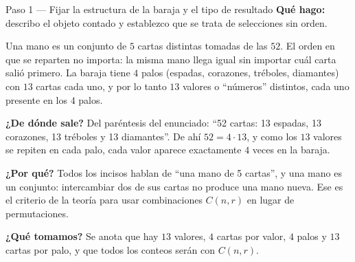 \documentclass[11pt]{article}
\begin{document}
\begin{paso}{Paso 1 --- Fijar la estructura de la baraja y el tipo de resultado}
\textbf{Qué hago:} describo el objeto contado y establezco que se trata de selecciones sin orden.

Una mano es un conjunto de $5$ cartas distintas tomadas de las $52$. El orden en que se reparten no importa: la misma mano llega igual sin importar cuál carta salió primero. La baraja tiene $4$ palos (espadas, corazones, tréboles, diamantes) con $13$ cartas cada uno, y por lo tanto $13$ valores o ``números'' distintos, cada uno presente en los $4$ palos.

\textbf{¿De dónde sale?} Del paréntesis del enunciado: ``52 cartas: 13 espadas, 13 corazones, 13 tréboles y 13 diamantes''. De ahí $52=4\cdot 13$, y como los $13$ valores se repiten en cada palo, cada valor aparece exactamente $4$ veces en la baraja.

\textbf{¿Por qué?} Todos los incisos hablan de ``una mano de 5 cartas'', y una mano es un conjunto: intercambiar dos de sus cartas no produce una mano nueva. Ese es el criterio de la teoría para usar combinaciones $C(n,r)$ en lugar de permutaciones.

\textbf{¿Qué tomamos?} Se anota que hay $13$ valores, $4$ cartas por valor, $4$ palos y $13$ cartas por palo, y que todos los conteos serán con $C(n,r)$.
\end{paso}
\end{document}
